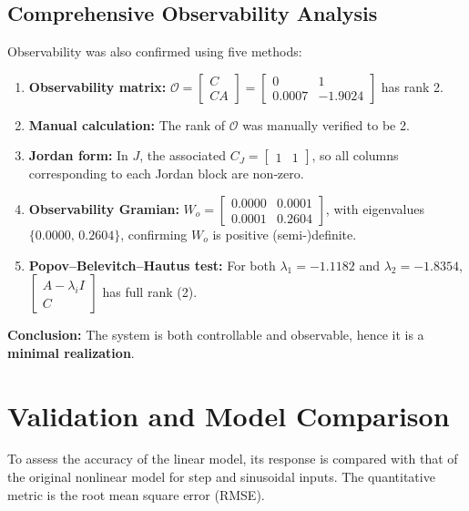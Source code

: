 \documentclass[12pt,a4paper]{article}
\begin{document}
\subsection{Comprehensive Observability Analysis}
Observability was also confirmed using five methods:
\begin{enumerate}
    \item \textbf{Observability matrix:} $\mathcal{O} = \begin{bmatrix} C \\ CA \end{bmatrix} = \begin{bmatrix} 0 & 1 \\ 0.0007 & -1.9024 \end{bmatrix}$ has rank 2.
    \item \textbf{Manual calculation:} The rank of $\mathcal{O}$ was manually verified to be 2.
    \item \textbf{Jordan form:} In $J$, the associated $C_J = \begin{bmatrix} 1 & 1 \end{bmatrix}$, so all columns corresponding to each Jordan block are non‑zero.
    \item \textbf{Observability Gramian:} $W_o = \begin{bmatrix} 0.0000 & 0.0001 \\ 0.0001 & 0.2604 \end{bmatrix}$, with eigenvalues $\{0.0000,\, 0.2604\}$, confirming $W_o$ is positive (semi‑)definite.
    \item \textbf{Popov–Belevitch–Hautus test:} For both $\lambda_1=-1.1182$ and $\lambda_2=-1.8354$, $\begin{bmatrix} A-\lambda_i I \\ C \end{bmatrix}$ has full rank (2).
\end{enumerate}

\textbf{Conclusion:} The system is both controllable and observable, hence it is a \textbf{minimal realization}.

\section{Validation and Model Comparison}
To assess the accuracy of the linear model, its response is compared with that of the original nonlinear model for step and sinusoidal inputs. The quantitative metric is the root mean square error (RMSE).
\end{document}
